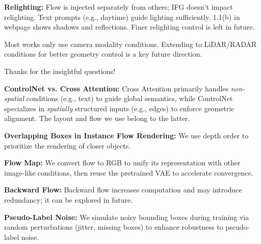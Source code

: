 \noindent \textbf{Relighting:}
Flow is injected separately from others; IFG doesn't impact relighting. 
Text prompts (e.g., daytime) guide lighting sufficiently. 1.1(b) in webpage shows shadows and reflections. Finer relighting control is left in future.








Most works only use camera modality conditions. Extending to LiDAR/RADAR conditions for better geometry control is a key future direction.








Thanks for the insightful questions! %

\noindent \textbf{ControlNet vs. Cross Attention:} 
Cross Attention primarily handles \textit{non-spatial} conditions (e.g., text) to guide global semantics, while ControlNet specializes in \textit{spatially} structured inputs (e.g., edges) to enforce geometric alignment. The layout and flow we use belong to the latter.


\noindent \textbf{Overlapping Boxes in Instance Flow Rendering:}
We use depth order to prioritize the rendering of closer objects.


\noindent \textbf{Flow Map:} 
We convert flow to RGB to unify its representation with other image-like conditions, then reuse the pretrained VAE to accelerate convergence. 

\noindent \textbf{Backward Flow:} 
Backward flow increases computation and may introduce redundancy; it can be explored in future.



\noindent \textbf{Pseudo-Label Noise:}
We simulate noisy bounding boxes during training via random perturbations (jitter, missing boxes) to enhance robustness to pseudo-label noise.


